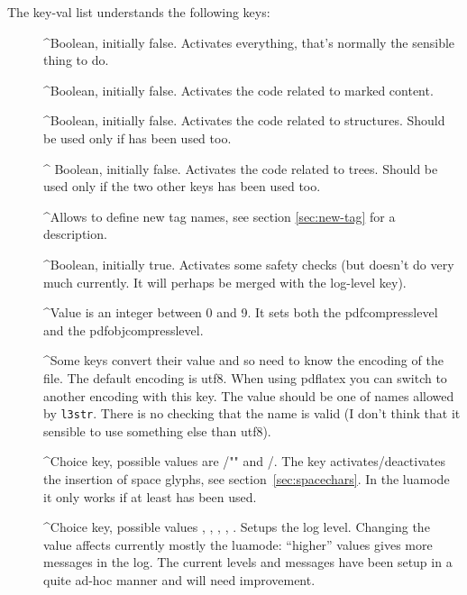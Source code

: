 \documentclass[DIV=12,parskip=half-,bibliography=totoc]{scrartcl}
\begin{document}
\TagP The key-val list understands the following keys:\TagPend
\begin{description}
\item[]
 \TagP^Boolean, initially false. Activates everything, that's normally the sensible thing to do.\Pmeti
\item[]
 \TagP^Boolean, initially false. Activates the code related to marked content.\Pmeti
\item[]
 \TagP^Boolean, initially false. Activates the code related to structures. Should be used only if  has been used too.\Pmeti
\item[]
\TagP^ Boolean, initially false. Activates the code related to trees. Should be used only if the two other keys has been used too.\Pmeti
\item[]
 \TagP^Allows to define new tag names, see section \ref{sec:new-tag} for a description.\Pmeti
\item[]
 \TagP^Boolean, initially true. Activates some safety checks (but doesn't do very much currently. It will perhaps be merged with the log-level key).\Pmeti
\item[]
 \TagP^Value is an integer between 0 and 9. It sets both the pdfcompresslevel and the pdfobjcompresslevel.\Pmeti
\item[]
 \TagP^Some keys convert their value and so need to know the encoding of the file. The default encoding is utf8.  When using pdflatex you can switch to another encoding with this key. The value should be one of names allowed by \texttt{l3str}. There is no checking that the name is valid (I don't think that it sensible to use something else than utf8).
 \Pmeti
\item[]
 \TagP^Choice key, possible values are /"" and /. The key activates/deactivates the insertion of space glyphs, see section~\ref{sec:spacechars}. In the luamode it only works if at least  has been used.\Pmeti
\item[]
 \TagP^Choice key, possible values , , , ,  .  Setups the log level.  Changing the value affects currently mostly the luamode: \enquote{higher} values gives more messages in the log. The current levels and messages have been setup in a quite ad-hoc manner and will need improvement.\Pmeti

\end{description}
\end{document}
